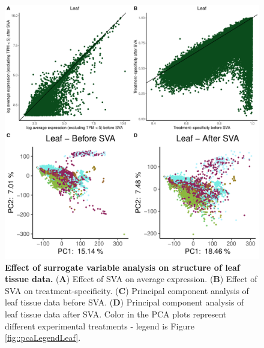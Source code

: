 \documentclass[12pt]{article}
\begin{document}
\begin{figure}[H]
\centering
\includegraphics[width = \linewidth]{figures/appendix_a/pca_beforeAndAfterSva_leaf_2023-02-21.pdf}
\caption{\textbf{Effect of surrogate variable analysis on structure of leaf tissue data.} (\textbf{A}) Effect of SVA on average expression. (\textbf{B}) Effect of SVA on treatment-specificity. (\textbf{C}) Principal component analysis of leaf tissue data before SVA. (\textbf{D}) Principal component analysis of leaf tissue data after SVA. Color in the PCA plots represent different experimental treatments - legend is Figure \ref{fig::pcaLegendLeaf}.}%
\end{figure}
\end{document}
